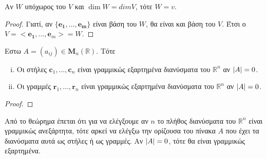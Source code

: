 \begin{cor}
  Αν $W$ υπόχωρος του $V$ και $ \dim W = dim V $, τότε $ W=v $.
\end{cor}
\begin{proof}
  Γιατί, αν $ \{ \mathbf{e_{1}}, \ldots, \mathbf{e_{m}}\}  $ είναι βάση του 
  $ W $, θα είναι και βάση του $V$. Έτσι ο 
  $ V = < \mathbf{e_{1}}, \ldots, \mathbf{e}_{m} > = W$.
\end{proof}

\begin{prop}
  Εστω $ A = (a_{ij}) \in \textbf{M}_{n}(\mathbb{R}) $. Τότε 
  \begin{enumerate}[i)]
    \item Οι στήλες $ \mathbf{c}_{1}, \ldots, \mathbf{c}_{n} $ είναι γραμμικώς 
      εξαρτημένα διανύσματα του $ \mathbb{R}^{n} $ αν $ \abs{A} = 0 $.
    \item Οι γραμμές $ \mathbf{r}_{1}, \ldots, \mathbf{r}_{n} $ είναι γραμμικώς 
      εξαρτημένα διανύσματα του $ \mathbb{R}^{n} $ αν $ \abs{A} = 0 $.
  \end{enumerate}
\end{prop}
\begin{proof}

\end{proof}

\begin{rem}
  Από το θεώρημα έπεται ότι για να ελέγξουμε αν $ n $ το πλήθος διανύσματα 
  του $ \mathbb{R}^{n} $ είναι γραμμικώς ανεξάρτητα, τότε αρκεί να ελέγξω την 
  ορίζουσα του πίνακα $A$ που έχει τα διανύσματα αυτά ως στήλες ή ως γραμμές. 
  Αν $ \abs{A} = 0 $, τότε θα είναι γραμμικώς εξαρτημένα.
\end{rem}

 
